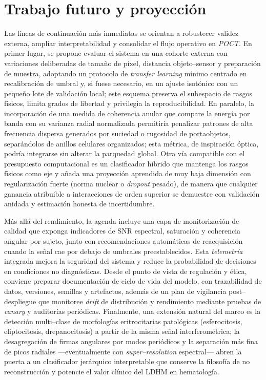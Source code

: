 \section*{Trabajo futuro y proyección}
Las líneas de continuación más inmediatas se orientan a robustecer validez externa, ampliar interpretabilidad y consolidar el flujo operativo en \emph{POCT}. En primer lugar, se propone evaluar el sistema en una cohorte externa con variaciones deliberadas de tamaño de píxel, distancia objeto–sensor y preparación de muestra, adoptando un protocolo de \emph{transfer learning} mínimo centrado en recalibración de umbral y, si fuese necesario, en un ajuste isotónico con un pequeño lote de validación local; este esquema preserva el subespacio de rasgos físicos, limita grados de libertad y privilegia la reproducibilidad. En paralelo, la incorporación de una medida de coherencia anular que compare la energía por banda con su varianza radial normalizada permitiría penalizar patrones de alta frecuencia dispersa generados por suciedad o rugosidad de portaobjetos, separándolos de anillos celulares organizados; esta métrica, de inspiración óptica, podría integrarse sin alterar la parquedad global. Otra vía compatible con el presupuesto computacional es un clasificador híbrido que mantenga los rasgos físicos como eje y añada una proyección aprendida de muy baja dimensión con regularización fuerte (norma nuclear o \emph{dropout} pesado), de manera que cualquier ganancia atribuible a interacciones de orden superior se demuestre con validación anidada y estimación honesta de incertidumbre.

Más allá del rendimiento, la agenda incluye una capa de monitorización de calidad que exponga indicadores de SNR espectral, saturación y coherencia angular por sujeto, junto con recomendaciones automáticas de reacquisición cuando la señal cae por debajo de umbrales preestablecidos. Esta \emph{telemetría} integrada mejora la seguridad del sistema y reduce la probabilidad de decisiones en condiciones no diagnósticas. Desde el punto de vista de regulación y ética, conviene preparar documentación de ciclo de vida del modelo, con trazabilidad de datos, versiones, semillas y artefactos, además de un plan de vigilancia post–despliegue que monitoree \emph{drift} de distribución y rendimiento mediante pruebas de \emph{canary} y auditorías periódicas. Finalmente, una extensión natural del marco es la detección multi–clase de morfologías eritrocitarias patológicas (esferocitosis, eliptocitosis, drepanocitosis) a partir de la misma señal interferométrica; la desagregación de firmas angulares por modos periódicos y la separación más fina de picos radiales —eventualmente con \emph{super–resolution} espectral— abren la puerta a un clasificador jerárquico interpretable que conserve la filosofía de no reconstrucción y potencie el valor clínico del LDHM en hematología.

